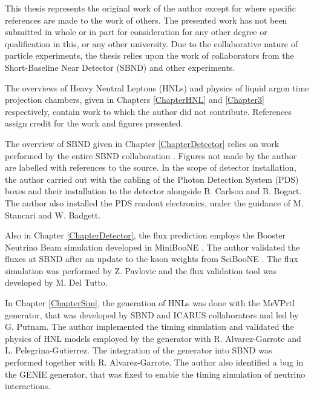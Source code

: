 
\begin{declaration}

This thesis represents the original work of the author except for where specific references are made to the work of others.
The presented work has not been submitted in whole or in part for consideration for any other degree or qualification in this, or any other university. 
Due to the collaborative nature of particle experiments, the thesis relies upon the work of collaborators from the Short-Baseline Near Detector (SBND) and other experiments.

The overviews of Heavy Neutral Leptons (HNLs) and physics of liquid argon time projection chambers, given in Chapters \ref{ChapterHNL} and \ref{Chapter3} respectively, contain work to which the author did not contribute.
References assign credit for the work and figures presented.

The overview of SBND given in Chapter \ref{ChapterDetector} relies on work performed by the entire SBND collaboration \cite{SBNProgram,sbnd_det}.
Figures not made by the author are labelled with references to the source.
In the scope of detector installation, the author carried out with the cabling of the Photon Detection System (PDS) boxes and their installation to the detector alongside B. Carlson and B. Bogart.
The author also installed the PDS readout electronics, under the guidance of M. Stancari and W. Badgett.

Also in Chapter \ref{ChapterDetector}, the flux prediction employs the Booster Neutrino Beam simulation developed in MiniBooNE \cite{BNBFlux}.
The author validated the fluxes at SBND after an update to the kaon weights from SciBooNE \cite{SciBooNE}.
The flux simulation was performed by Z. Pavlovic and the flux validation tool was developed by M. Del Tutto. 

In Chapter \ref{ChapterSim}, the generation of HNLs was done with the MeVPrtl generator, that was developed by SBND and ICARUS collaborators and led by G. Putnam.
The author implemented the timing simulation and validated the physics of HNL models employed by the generator with R. Alvarez-Garrote and L. Pelegrina-Gutierrez.
The integration of the generator into SBND was performed together with R. Alvarez-Garrote.
The author also identified a bug in the GENIE generator, that was fixed to enable the timing simulation of neutrino interactions.


\end{declaration}
